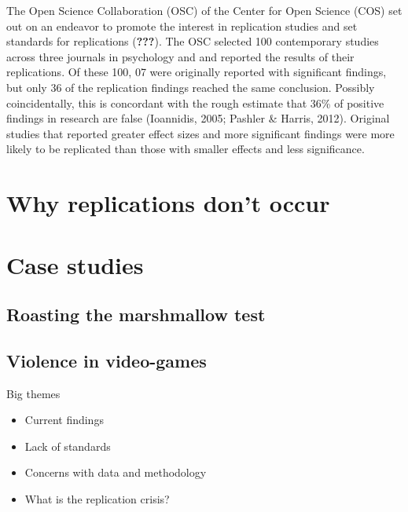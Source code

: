 \documentclass[man]{apa6}
\theoremstyle{definition}
\theoremstyle{definition}
\theoremstyle{definition}
\theoremstyle{remark}
\begin{document}
The Open Science Collaboration (OSC) of the Center for Open Science
(COS) set out on an endeavor to promote the interest in replication
studies and set standards for replications ({\textbf{???}}). The OSC
selected 100 contemporary studies across three journals in psychology
and and reported the results of their replications. Of these 100, 07
were originally reported with significant findings, but only 36 of the
replication findings reached the same conclusion. Possibly
coincidentally, this is concordant with the rough estimate that 36\% of
positive findings in research are false (Ioannidis, 2005; Pashler \&
Harris, 2012). Original studies that reported greater effect sizes and
more significant findings were more likely to be replicated than those
with smaller effects and less significance.

\hypertarget{why-replications-dont-occur}{%
\section{Why replications don't
occur}\label{why-replications-dont-occur}}

\hypertarget{case-studies}{%
\section{Case studies}\label{case-studies}}

\hypertarget{roasting-the-marshmallow-test}{%
\subsection{Roasting the marshmallow
test}\label{roasting-the-marshmallow-test}}

\hypertarget{violence-in-video-games}{%
\subsection{Violence in video-games}\label{violence-in-video-games}}

Big themes

\begin{itemize}
\item
  Current findings
\item
  Lack of standards
\item
  Concerns with data and methodology
\item
  What is the replication crisis?
\end{itemize}
\end{document}
